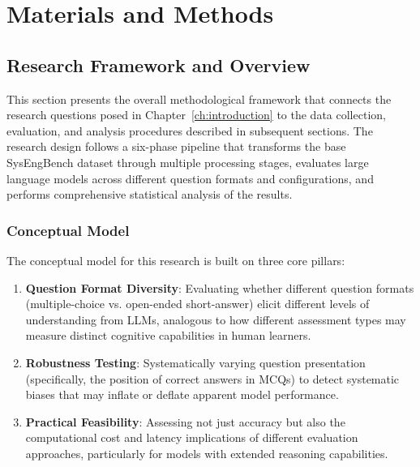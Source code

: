\chapter{Materials and Methods}\label{ch:materials_methods}


\section{Research Framework and Overview}\label{sec:research_framework}

This section presents the overall methodological framework that connects the research questions posed in Chapter~\ref{ch:introduction} to the data collection, evaluation, and analysis procedures described in subsequent sections. The research design follows a six-phase pipeline that transforms the base SysEngBench dataset through multiple processing stages, evaluates large language models across different question formats and configurations, and performs comprehensive statistical analysis of the results.

\subsection{Conceptual Model}

The conceptual model for this research is built on three core pillars:

\begin{enumerate}
    \item \textbf{Question Format Diversity}: Evaluating whether different question formats (multiple-choice vs. open-ended short-answer) elicit different levels of understanding from LLMs, analogous to how different assessment types may measure distinct cognitive capabilities in human learners.

    \item \textbf{Robustness Testing}: Systematically varying question presentation (specifically, the position of correct answers in MCQs) to detect systematic biases that may inflate or deflate apparent model performance.

    \item \textbf{Practical Feasibility}: Assessing not just accuracy but also the computational cost and latency implications of different evaluation approaches, particularly for models with extended reasoning capabilities.
\end{enumerate}


